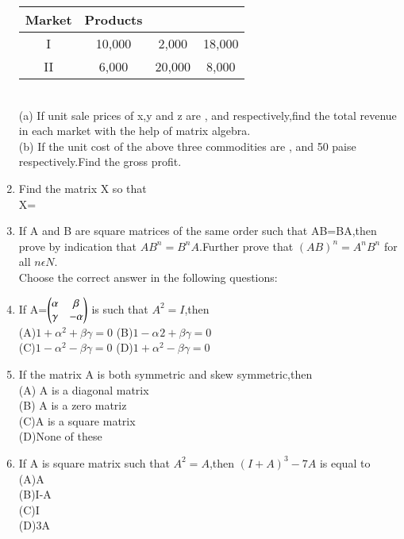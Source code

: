 \begin{enumerate}[label=\arabic*.,ref=\thesubsection.\theenumi]
  \begin{tabular}{cccc}
  \hline
  Market & Products\\
  \hline
  I &10,000 &2,000 &18,000\\
  \hline
  II &6,000 &20,000 &8,000\\
  \hline
  \end{tabular}\\
  (a) If unit sale prices of x,y and z are , and  respectively,find the total revenue in each market with the help of matrix algebra.\\
  (b) If the unit cost of the above three commodities are , and 50 paise respectively.Find the gross profit.\\
  \item Find the matrix X so that\\ X=\\
  \item If A and B are square matrices of the same order such that AB=BA,then prove by indication that $AB^{n}=B^{n}A$.Further prove that $(AB)^{n}=A^{n}B^{n}$ for all $n \epsilon N$.\\
  Choose the correct answer in the following questions:\\
  \item If A=$\begin{pmatrix}\alpha &\beta\\ \gamma &-\alpha\end{pmatrix}$ is such that $A^{2}=I$,then\\
  (A)$1+\alpha^{2}+\beta\gamma=0$ (B)$1-\alpha^{}2+\beta\gamma=0$\\
  (C)$1-\alpha^{2}-\beta\gamma=0$ (D)$1+\alpha^{2}-\beta\gamma=0$\\
  \item If the matrix A is both symmetric and skew symmetric,then\\
  (A) A is a diagonal matrix \\
  (B) A is a zero matriz\\
  (C)A is a square matrix \\
  (D)None of these\\
  \item If A is square matrix such that $A^{2}=A$,then $(I+A)^{3}-7A$ is equal to\\
  (A)A \\(B)I-A\\ (C)I\\ (D)3A
  \end{enumerate}

%        
